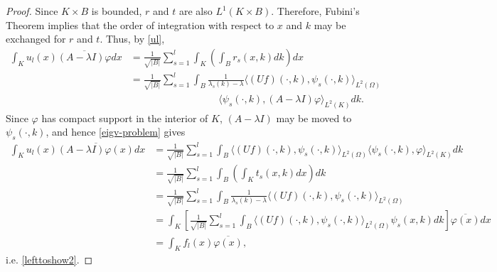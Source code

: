 \begin{theorem}
\begin{proof}
		Since $K \times B$ is bounded, $r$ and $t$ are also $L^{1}(K \times B)$. Therefore, Fubini's Theorem implies that the order of integration with respect to $x$ and $k$ may be exchanged for $r$ and $t$. Thus, by \eqref{ul},
			\begin{align*}
				\int_{K} u_{l}(x) \overline{(A - \lambda I) \varphi} dx & = \frac{1}{\sqrt{|B|}} \sum_{s=1}^{l} \int_{K} \left( \int_{B} r_{s}(x, k) dk \right) dx \\
					& = \frac{1}{\sqrt{|B|}} \sum_{s=1}^{l} \int_{B} \frac{1}{\lambda_{s}(k) - \lambda} \langle (Uf)(\cdot, k), \psi_{s}(\cdot, k) \rangle_{L^{2}(\Omega)} \\
					& ~\qquad ~\qquad ~\qquad ~\qquad \langle \psi_{s}(\cdot, k), (A - \lambda I) \varphi \rangle_{L^{2}(K)} dk. 
			\end{align*}
			Since $\varphi$ has compact support in the interior of $K$, $(A - \lambda I)$ may be moved to $\psi_{s}(\cdot, k)$, and hence \eqref{eigv-problem} gives
			\begin{align*}
				\int_{K} u_{l}(x) \overline{(A - \lambda I) \varphi(x)} dx					& = \frac{1}{\sqrt{|B|}} \sum_{s=1}^{l} \int_{B} \langle (Uf)(\cdot, k), \psi_{s}(\cdot, k) \rangle_{L^{2}(\Omega)} \langle \psi_{s}(\cdot, k), \varphi \rangle_{L^{2}(K)} dk \\
				 	& = \frac{1}{\sqrt{|B|}} \sum_{s=1}^{l} \int_{B} \left( \int_{K} t_{s}(x, k) dx \right) dk \\
					& = \frac{1}{\sqrt{|B|}} \sum_{s=1}^{l} \int_{B} \frac{1}{\lambda_{s}(k) - \lambda} \langle (Uf)(\cdot, k), \psi_{s}(\cdot, k) \rangle_{L^{2}(\Omega)} \\
					& = \int_{K} \left[ \frac{1}{\sqrt{|B|}} \sum_{s=1}^{l} \int_{B} \langle (Uf)(\cdot, k), \psi_{s}(\cdot, k) \rangle_{L^{2}(\Omega)} \psi_{s}(x, k) dk \right] \overline{\varphi(x)} dx \\
					& = \int_{K} f_{l}(x) \overline{\varphi(x)},
			\end{align*}
			i.e. \eqref{lefttoshow2}.
	\end{proof}
\end{theorem}






